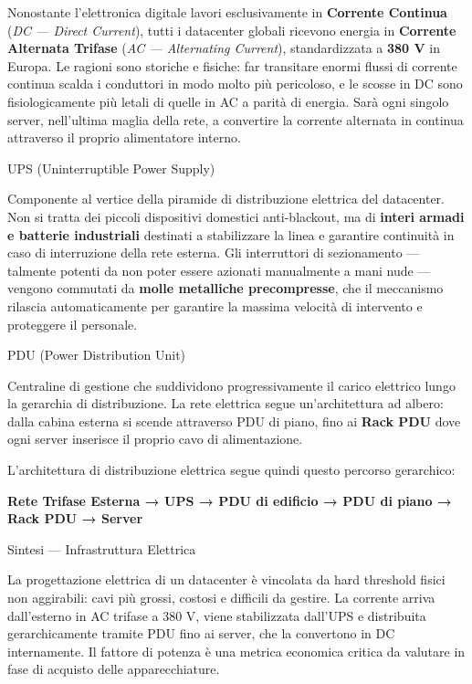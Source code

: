 \documentclass[
  italian,
  openany]{book}
\begin{document}
Nonostante l'elettronica digitale lavori esclusivamente in
\textbf{Corrente Continua} (\emph{DC --- Direct Current}), tutti i
datacenter globali ricevono energia in \textbf{Corrente Alternata
Trifase} (\emph{AC --- Alternating Current}), standardizzata a
\textbf{380 V} in Europa. Le ragioni sono storiche e fisiche: far
transitare enormi flussi di corrente continua scalda i conduttori in
modo molto più pericoloso, e le scosse in DC sono fisiologicamente più
letali di quelle in AC a parità di energia. Sarà ogni singolo server,
nell'ultima maglia della rete, a convertire la corrente alternata in
continua attraverso il proprio alimentatore interno.

\begin{calloutdefinition}{UPS (Uninterruptible Power Supply)}

Componente al vertice della piramide di distribuzione elettrica del
datacenter. Non si tratta dei piccoli dispositivi domestici
anti-blackout, ma di \textbf{interi armadi e batterie industriali}
destinati a stabilizzare la linea e garantire continuità in caso di
interruzione della rete esterna. Gli interruttori di sezionamento ---
talmente potenti da non poter essere azionati manualmente a mani nude
--- vengono commutati da \textbf{molle metalliche precompresse}, che il
meccanismo rilascia automaticamente per garantire la massima velocità di
intervento e proteggere il personale.

\end{calloutdefinition}

\begin{calloutdefinition}{PDU (Power Distribution Unit)}

Centraline di gestione che suddividono progressivamente il carico
elettrico lungo la gerarchia di distribuzione. La rete elettrica segue
un'architettura ad albero: dalla cabina esterna si scende attraverso PDU
di piano, fino ai \textbf{Rack PDU} dove ogni server inserisce il
proprio cavo di alimentazione.

\end{calloutdefinition}

L'architettura di distribuzione elettrica segue quindi questo percorso
gerarchico:

\textbf{Rete Trifase Esterna → UPS → PDU di edificio → PDU di piano →
Rack PDU → Server}

\begin{calloutnote}{Sintesi — Infrastruttura Elettrica}

La progettazione elettrica di un datacenter è vincolata da hard
threshold fisici non aggirabili: cavi più grossi, costosi e difficili da
gestire. La corrente arriva dall'esterno in AC trifase a 380 V, viene
stabilizzata dall'UPS e distribuita gerarchicamente tramite PDU fino ai
server, che la convertono in DC internamente. Il fattore di potenza è
una metrica economica critica da valutare in fase di acquisto delle
apparecchiature.

\end{calloutnote}
\end{document}
